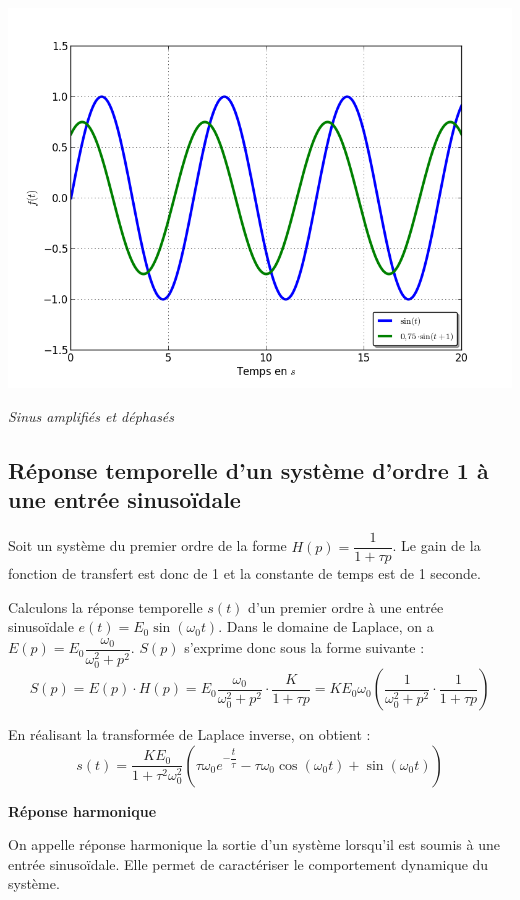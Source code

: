 \documentclass[10pt,oneside]{article}
\begin{document}
\begin{minipage}[c]{.3\linewidth}
\begin{center}
\includegraphics[width=.95\textwidth]{png/sinus_ampli_dephase}

\textit{Sinus amplifiés et déphasés}
\end{center}
\end{minipage}


\subsection{Réponse temporelle d'un système d'ordre 1 à une entrée sinusoïdale}

Soit un système du premier ordre de la forme $H(p)=\dfrac{1}{1+\tau p}$. Le gain de la fonction de transfert est donc de 1 et la constante de temps est de 1 seconde. 

Calculons la réponse temporelle $s(t)$ d'un premier ordre à une entrée sinusoïdale $e(t)=E_0  \sin \left( \omega_0 t\right)$. Dans le domaine de Laplace, on a $E(p)=E_0\dfrac{\omega_0}{\omega_0^2+p^2}$. $S(p)$ s'exprime donc sous la forme suivante :
$$
S(p)=E(p)\cdot H(p) = E_0\dfrac{\omega_0}{\omega_0^2+p^2} \cdot \dfrac{K}{1+\tau p }
= KE_0\omega_0 \left( \dfrac{1}{\omega_0^2+p^2} \cdot \dfrac{1}{1+\tau p }\right)
$$

En réalisant la transformée de Laplace inverse, on obtient : 
$$
s(t)=\dfrac{KE_0}{1+\tau^2\omega_0^2} 
\left( 
\tau \omega_0  e^{-\dfrac{t}{\tau}} 
-\tau \omega_0  \cos \left( \omega_0 t \right)
+\sin \left( \omega_0 t\right)
\right)
$$



\begin{defi}
\textbf{Réponse harmonique}

On appelle réponse harmonique la sortie d'un système lorsqu'il est soumis à une entrée sinusoïdale. Elle permet de caractériser le comportement dynamique du système.
\end{defi}
\end{document}
